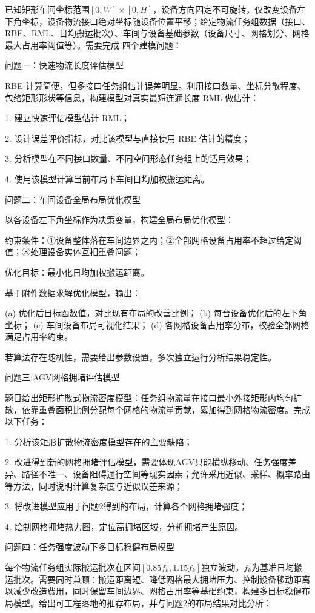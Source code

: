 \documentclass[12pt,a4paper]{article}
\begin{document}
	已知矩形车间坐标范围\([0,W]\times[0,H]\)，设备方向固定不可旋转，仅改变设备左下角坐标，设备物流接口绝对坐标随设备位置平移；给定物流任务组数据（接口、RBE、RML、日均搬运批次）、车间与设备基础参数（设备尺寸、网格划分、网格最大占用率阈值等）。需要完成 四个建模问题：
	
	问题一：快速物流长度评估模型
	
	RBE 计算简便，但多接口任务组估计误差明显。利用接口数量、坐标分散程度、包络矩形形状等信息，构建模型对真实最短连通长度 RML 做估计：
	
	1. 建立快速评估模型估计 RML；
	
	2. 设计误差评价指标，对比该模型与直接使用 RBE 估计的精度；

	3. 分析模型在不同接口数量、不同空间形态任务组上的适用效果；
	
	4. 使用该模型计算当前布局下车间日均加权搬运距离。
	
	问题二：车间设备全局布局优化模型
	
	以各设备左下角坐标作为决策变量，构建全局布局优化模型：
	
	约束条件：①设备整体落在车间边界之内；②全部网格设备占用率不超过给定阈值；③处理设备实体互相重叠问题；
	
	优化目标：最小化日均加权搬运距离。
	
	基于附件数据求解优化模型，输出：
	
	(a) 优化后目标函数值，对比现有布局的改善比例；
	(b) 每台设备优化后的左下角坐标；
	(c) 车间设备布局可视化结果；
	(d) 各网格设备占用率分布，校验全部网格满足占用率约束。
	
	若算法存在随机性，需要给出参数设置，多次独立运行分析结果稳定性。
	
	问题三:AGV网格拥堵评估模型
	
	题目给出矩形扩散式物流密度模型：任务组物流量在接口最小外接矩形内均匀扩散，依靠重叠面积比例分配每个网格的物流量贡献，累加得到网格物流密度。完成以下任务：
	
	1. 分析该矩形扩散物流密度模型存在的主要缺陷；
	
	2. 改进得到新的网格拥堵评估模型，需要体现AGV只能横纵移动、任务强度差异、路径不唯一、设备阻碍通行空间等现实因素；允许采用近似、采样、概率路由等方法，同时说明计算复杂度与近似误差来源；
	
	3. 将改进模型应用于问题2得到的布局，计算各个网格拥堵强度；
	
	4. 绘制网格拥堵热力图，定位高拥堵区域，分析拥堵产生原因。
	
	问题四：任务强度波动下多目标稳健布局模型
	
	每个物流任务组实际搬运批次在区间\([0.85f_k,1.15f_k]\)独立波动，\(f_k\)为基准日均搬运批次。需要同时兼顾：搬运距离短、降低网格最大拥堵压力、控制设备移动距离以减少改造费用，同时保留车间边界、网格占用率等基础约束，构建多目标稳健布局模型。给出可工程落地的推荐布局，并与问题2的布局结果对比分析：
	
\end{document}
